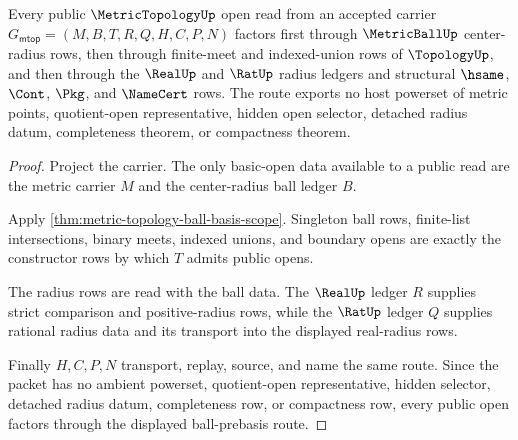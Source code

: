 \begin{theorem}
\label{thm:metric-topology-ball-prebasis-route}
Every public $\MetricTopologyUp$ open read from an accepted carrier $G_{\mathsf{mtop}}=(M,B,T,R,Q,H,C,P,N)$ factors first through $\MetricBallUp$ center-radius rows, then through finite-meet and indexed-union rows of $\TopologyUp$, and then through the $\RealUp$ and $\RatUp$ radius ledgers and structural $\hsame$, $\Cont$, $\Pkg$, and $\NameCert$ rows. The route exports no host powerset of metric points, quotient-open representative, hidden open selector, detached radius datum, completeness theorem, or compactness theorem.
\end{theorem}
\begin{proof}
Project the carrier. The only basic-open data available to a public read are the metric carrier $M$ and the center-radius ball ledger $B$.

Apply \autoref{thm:metric-topology-ball-basis-scope}. Singleton ball rows, finite-list intersections, binary meets, indexed unions, and boundary opens are exactly the constructor rows by which $T$ admits public opens.

The radius rows are read with the ball data. The $\RealUp$ ledger $R$ supplies strict comparison and positive-radius rows, while the $\RatUp$ ledger $Q$ supplies rational radius data and its transport into the displayed real-radius rows.

Finally $H,C,P,N$ transport, replay, source, and name the same route. Since the packet has no ambient powerset, quotient-open representative, hidden selector, detached radius datum, completeness row, or compactness row, every public open factors through the displayed ball-prebasis route.
\end{proof}

\begin{closurestatus}{\MetricTopologyUp}
  \theoryclosure{\seedClosure}
  \formalstatus{\unformalizedV}
\end{closurestatus}
